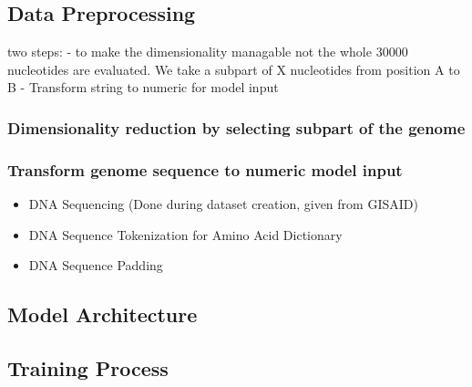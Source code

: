 \subsection{Data Preprocessing}  \label{ch:approachB}

two steps:
- to make the dimensionality managable not the whole 30000 nucleotides are evaluated. We take a subpart of X nucleotides from position A to B
- Transform string to numeric for model input

\subsubsection{Dimensionality reduction by selecting subpart of the genome}
\label{ch:approachBa}


\subsubsection{Transform genome sequence to numeric model input}
\label{ch:approachBb}


\begin{itemize}
	\item DNA Sequencing (Done during dataset creation, given from GISAID)
	\item DNA Sequence Tokenization for Amino Acid Dictionary
	\item DNA Sequence Padding
\end{itemize}

\subsection{Model Architecture}  \label{ch:approachC}

\subsection{Training Process} \label{ch:approachD}

\newpage
